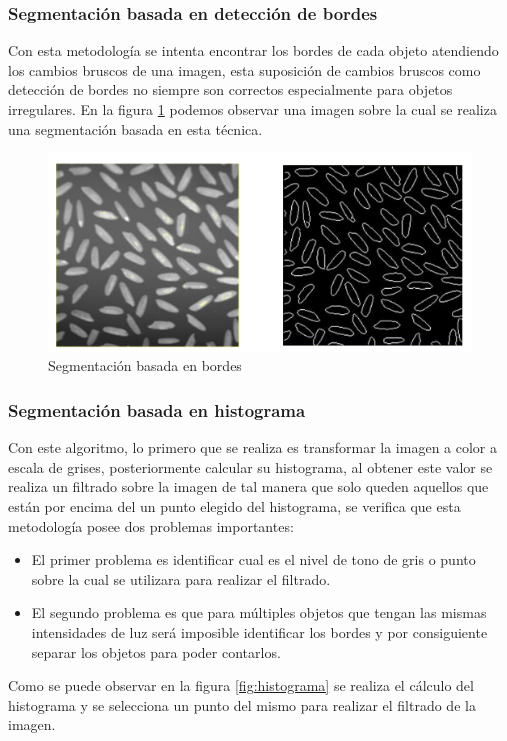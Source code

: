 \documentclass[conference,compsoc]{IEEEtran}
\begin{document}
\subsubsection{Segmentación basada en detección de bordes}
Con esta metodología se intenta encontrar los bordes de cada objeto atendiendo los cambios bruscos de una imagen, esta suposición de cambios bruscos como detección de bordes no siempre son correctos especialmente para objetos irregulares. En la figura \ref{fig:bordes} podemos observar una imagen sobre la cual se realiza una segmentación basada en esta técnica.

\begin{figure}[H]
\centering
\includegraphics[scale=0.5]{bordes.png}
\caption{\label{fig:bordes}Segmentación basada en bordes}
\end{figure}

\subsubsection{Segmentación basada en histograma}
Con este algoritmo, lo primero que se realiza es transformar la imagen a color a escala de grises, posteriormente calcular su histograma, al obtener este valor se realiza un filtrado sobre la imagen de tal manera que solo queden aquellos que están por encima del un punto elegido del histograma, se verifica que esta metodología posee dos problemas importantes:
\begin{itemize}
    \item El primer problema es identificar cual es el nivel de tono de gris o punto sobre la cual se utilizara para realizar el filtrado.
    \item El segundo problema es que para múltiples objetos que tengan las mismas intensidades de luz será imposible identificar los bordes y por consiguiente separar los objetos para poder contarlos.
\end{itemize}
Como se puede observar en la figura \ref{fig:histograma} se realiza el cálculo del histograma y se selecciona un punto del mismo para realizar el filtrado de la imagen.
\end{document}
